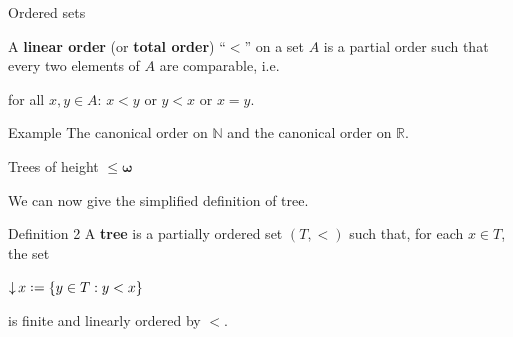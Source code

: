 \documentclass{beamer}
\theoremstyle{num.custom-title}
\theoremstyle{custom-title}
\DeclareMathOperator{\down}{\downarrow}
\newcommand{\N}{\mathbb{N}}
\newcommand{\R}{\mathbb{R}}
\newcommand*{\defeq}{\mathrel{\rlap{%
                     \raisebox{0.3ex}{$\cdot$}}%
                     \raisebox{-0.3ex}{$\cdot$}}%
                     =}
\renewcommand{\emph}[1]{\textbf{#1}}
\begin{document}
\begin{frame}{Ordered sets}

\begin{definition}
A \emph{linear order} (or \emph{total order}) ``$<$'' on a set $A$ is a partial order such that every two elements of $A$ are comparable, i.e.
\begin{center}
for all $x,y \in A$: \quad $x<y$ or $y<x$ or $x=y$.
\end{center}
\end{definition}

\pause

\begin{exampleblock}{Example}
The canonical order on $\N$ and the canonical order on $\R$.
\end{exampleblock}

\end{frame}


\begin{frame}{Trees of height $\pmb{\leq \omega}$}

We can now give the simplified definition of tree.

\pause

\begin{block}{Definition 2}
A \emph{tree} is a partially ordered set $(T,<)$ such that, for each $x \in T$, the set
\begin{center}
$\down x \defeq \{y \in T : y < x\}$
\end{center}
is finite and linearly ordered by $<$.
\end{block}

\end{frame}
\end{document}
